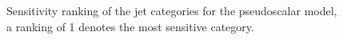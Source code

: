 \begin{figure}[h!] \centering
  \caption{Sensitivity ranking of the jet categories for the pseudoscalar model, a ranking of 1 denotes the most sensitive category. }
  \label{fig:sensitivityPS} 
\end{figure}

